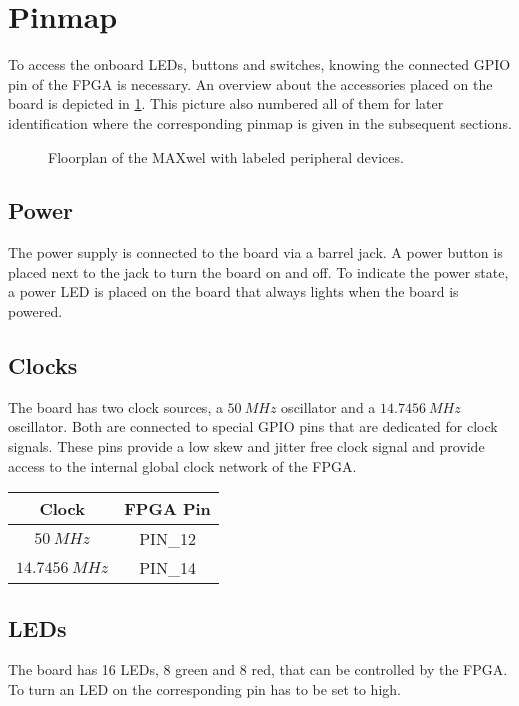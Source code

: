 \section{Pinmap}

To access the onboard LEDs, buttons and switches, knowing the connected GPIO pin of the FPGA is necessary.
An overview about the accessories placed on the board is depicted in \cref{fig:floorplan_full}.
This picture also numbered all of them for later identification where the corresponding pinmap is given in the subsequent sections.

\begin{figure}[h!]
    \centering
    
    \caption{Floorplan of the MAXwel with labeled peripheral devices.}
    \label{fig:floorplan_full}
\end{figure}

\subsection{Power}
The power supply is connected to the board via a barrel jack.
A power button is placed next to the jack to turn the board on and off.
To indicate the power state, a power LED is placed on the board that always lights when the board is powered.

\subsection{Clocks}
The board has two clock sources, a $\SI{50}{MHz}$ oscillator and a $\SI{14,7456}{MHz}$ oscillator.
Both are connected to special GPIO pins that are dedicated for clock signals.
These pins provide a low skew and jitter free clock signal and provide access to the internal global clock network of the FPGA.

\begin{center}
	\begin{tabular}{c c}
		Clock & FPGA Pin \\
		\hline
		$\SI{50}{MHz}$ & PIN\_12 \\
		$\SI{14.7456}{MHz}$ & PIN\_14 \\
		\hline
	\end{tabular}
\end{center}

\subsection{LEDs}
The board has 16 LEDs, 8 green and 8 red, that can be controlled by the FPGA.
To turn an LED on the corresponding pin has to be set to high.

